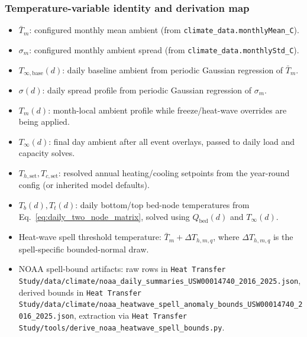 \documentclass[11pt]{article}
\begin{document}
\subsubsection*{Temperature-variable identity and derivation map}
\begin{itemize}[leftmargin=*]
\item \(\bar T_m\): configured monthly mean ambient (from \texttt{climate\_data.monthlyMean\_C}).
\item \(\sigma_m\): configured monthly ambient spread (from \texttt{climate\_data.monthlyStd\_C}).
\item \(T_{\infty,\mathrm{base}}(d)\): daily baseline ambient from periodic Gaussian regression of \(\bar T_m\).
\item \(\sigma(d)\): daily spread profile from periodic Gaussian regression of \(\sigma_m\).
\item \(T_m(d)\): month-local ambient profile while freeze/heat-wave overrides are being applied.
\item \(T_\infty(d)\): final day ambient after all event overlays, passed to daily load and capacity solves.
\item \(T_{h,\mathrm{set}},T_{c,\mathrm{set}}\): resolved annual heating/cooling setpoints from the year-round config (or inherited model defaults).
\item \(T_b(d),T_t(d)\): daily bottom/top bed-node temperatures from Eq.~\eqref{eq:daily_two_node_matrix}, solved using \(Q_{\mathrm{bed}}(d)\) and \(T_\infty(d)\).
\item Heat-wave spell threshold temperature: \(\bar T_m+\Delta T_{h,m,q}\), where \(\Delta T_{h,m,q}\) is the spell-specific bounded-normal draw.
\item NOAA spell-bound artifacts: raw rows in \texttt{Heat Transfer Study/data/climate/noaa\_daily\_summaries\_USW00014740\_2016\_2025.json}, derived bounds in \texttt{Heat Transfer Study/data/climate/noaa\_heatwave\_spell\_anomaly\_bounds\_USW00014740\_2016\_2025.json}, extraction via \texttt{Heat Transfer Study/tools/derive\_noaa\_heatwave\_spell\_bounds.py}.
\end{itemize}
\end{document}
